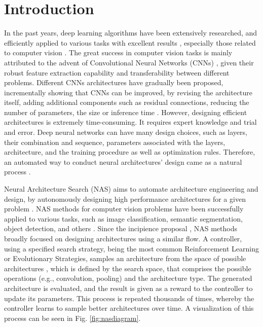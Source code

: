 \documentclass[10pt, conference]{IEEEtran}
\begin{document}
\IEEEpeerreviewmaketitle








\section{Introduction}
In the past years, deep learning algorithms have been extensively researched, and efficiently applied to various tasks with excellent results \cite{deng2014deep, goodfellow2016deep}, especially those related to computer vision \cite{voulodimos2018deep}. The great success in computer vision tasks is mainly attributed to the advent of Convolutional Neural Networks (CNNs) \cite{khan2020survey}, given their robust feature extraction capability and transferability between different problems. Different CNNs architectures have gradually been proposed, incrementally showing that CNNs can be improved, by revising the architecture itself, adding additional components such as residual connections, reducing the number of parameters, the size or inference time \cite{DBLP:conf/nips/KrizhevskySH12, DBLP:journals/corr/SimonyanZ14a, DBLP:conf/cvpr/SzegedyLJSRAEVR15, DBLP:conf/cvpr/HeZRS16, DBLP:conf/cvpr/HuangLMW17, DBLP:conf/icml/TanL19}. However, designing efficient architectures is extremely time-consuming. It requires expert knowledge and trial and error. Deep neural networks can have many design choices, such as layers, their combination and sequence, parameters associated with the layers, architecture, and the training procedure as well as optimization rules. Therefore, an automated way to conduct neural architectures' design came as a natural process \cite{hutter2019automated}.


Neural Architecture Search (NAS) aims to automate architecture engineering and design, by autonomously designing high performance architectures for a given problem \cite{elsken2019neural}. NAS methods for computer vision problems have been successfully applied to various tasks, such as image classification, semantic segmentation, object detection, and others \cite{elsken2019neural, DBLP:journals/corr/abs-1905-01392}. Since the incipience proposal \cite{DBLP:conf/iclr/ZophL17}, NAS methods broadly focused on designing architectures using a similar flow. A controller, using a specified search strategy, being the most common Reinforcement Learning or Evolutionary Strategies, samples an architecture  from the space of possible architectures , which is defined by the search space, that comprises the possible operations (e.g., convolution, pooling) and the architecture type. The generated architecture is evaluated, and the result is given as a reward to the controller to update its parameters. This process is repeated thousands of times, whereby the controller learns to sample better architectures over time. A visualization of this process can be seen in Fig. \ref{fig:nasdiagram}.
\end{document}
